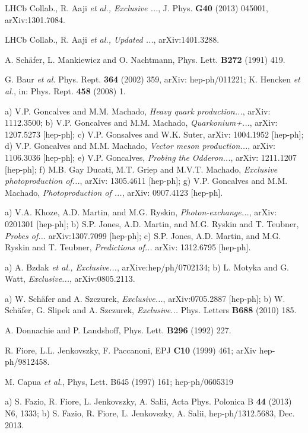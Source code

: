 \documentclass[12pt]{article}
\begin{document}
\begin{thebibliography}{99}
 LHCb Collab., R. Aaji {\it et al., Exclusive ...}, J. Phys. {\bf G40} (2013) 045001, arXiv:1301.7084.

  LHCb Collab., R. Aaji {\it et al., Updated ...}, arXiv:1401.3288. 

 A. Sch\"afer, L. Mankiewicz and O. Nachtmann, Phys. Lett. {\bf B272} (1991) 419.

 G. Baur {\it et al.} Phys. Rept. {\bf 364} (2002) 359, arXiv: hep-ph/011221; K. Hencken {\it et al.}, in: Phys. Rept. {\bf 458} (2008) 1.

 a) V.P. Goncalves and M.M. Machado, {\it Heavy quark production...}, arXiv: 1112.3500;
b) V.P. Goncalves and M.M. Machado, {\it Quarkonium+...}, arXiv: 1207.5273 [hep-ph]; c) V.P. Gonsalves and W.K. Suter, arXiv: 1004.1952 [hep-ph];
d) V.P. Goncalves and M.M. Machado, {\it Vector meson production...}, arXiv: 1106.3036 [hep-ph]; e) V.P. Goncalves, {\it Probing the Odderon...},
arXiv: 1211.1207 [hep-ph]; f) M.B. Gay Ducati, M.T. Griep and M.V.T. Machado, {\it Exclusive photoproduction of...}, arXiv: 1305.4611 [hep-ph]; 
g) V.P. Goncalves and M.M. Machado, {\it Photoproduction of ...}, arXiv: 0907.4123 [hep-ph].

 a) V.A. Khoze, A.D. Martin, and M.G. Ryskin, {\it Photon-exchange...}, arXiv: 0201301 [hep-ph]; 
b) S.P. Jones, A.D. Martin, and M.G. Ryskin and T. Teubner, {\it Probes of...} arXiv:1307.7099 [hep-ph]; 
c) S.P. Jones, A.D. Martin, and M.G. Ryskin and T. Teubner, {\it Predictions of...} arXiv: 1312.6795 [hep-ph].

 a) A. Bzdak {\it et al., Exclusive...}, arXive:hep/ph/0702134; b) L. Motyka and G. Watt, {\it Exclusive...}, arXiv:0805.2113.  

 a) W. Sch\"afer and A. Szczurek, {\it Exclusive...}, arXiv:0705.2887 [hep-ph]; b) W. Sch\"afer, G. Slipek and A. Szczurek,
{\it Exclusive...} Phys. Letters {\bf B688} (2010) 185. 

 A. Donnachie and P. Landshoff, Phys. Lett. {\bf B296} (1992) 227.

 R. Fiore, L.L. Jenkovszky, F. Paccanoni, EPJ {\bf C10} (1999) 461; arXiv hep-ph/9812458.

 M. Capua {\it et al.}, Phys, Lett. {B645} (1997) 161; hep-ph/0605319

 a) S. Fazio, R. Fiore, L. Jenkovszky, A. Salii, Acta Phys. Polonica B {\bf 44} (2013) N6, 1333; b) S. Fazio, R. Fiore, L. Jenkovszky, A. Salii, 
hep-ph/1312.5683, Dec. 2013. 

\end{thebibliography}
\end{document}
